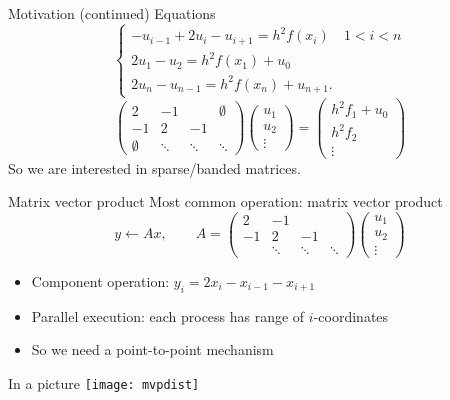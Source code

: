 \begin{numberedframe}{Motivation (continued)}
  Equations
  \[
  \begin{cases}
    -u_{i-1} + 2u_i - u_{i+1} = h^2f(x_i)&1<i<n \\
    2u_1-u_2=h^2f(x_1)+u_0\\
    2u_n-u_{n-1}=h^2f(x_{n})+u_{n+1}.
  \end{cases}
  \]
  \begin{equation}
    \begin{pmatrix}
      2&-1&&\emptyset\\ -1&2&-1\\ \emptyset&\ddots&\ddots&\ddots
    \end{pmatrix}
    \begin{pmatrix}
      u_1\\ u_2\\ \vdots
    \end{pmatrix}
    =
    \begin{pmatrix}
      h^2f_1+u_0\\ h^2f_2\\ \vdots
    \end{pmatrix}
    \label{eq:1d2nd-matrix-vector}
  \end{equation}
  So we are interested in sparse/banded matrices.
\end{numberedframe}

\begin{numberedframe}{Matrix vector product}
  Most common operation: matrix vector product
  \[ y\leftarrow Ax,\qquad
  A = \begin{pmatrix}
      2&-1\\ -1&2&-1\\ &\ddots&\ddots&\ddots
    \end{pmatrix}
    \begin{pmatrix}
      u_1\\ u_2\\ \vdots
    \end{pmatrix}
  \]
  \begin{itemize}
  \item Component operation: $y_i=2x_i-x_{i-1}-x_{i+1}$
  \item Parallel execution: each process has range of $i$-coordinates
  \item So we need a point-to-point mechanism
  \end{itemize}  
\end{numberedframe}

\begin{numberedframe}{In a picture}
  \texttt{[image: mvpdist]}
\end{numberedframe}

